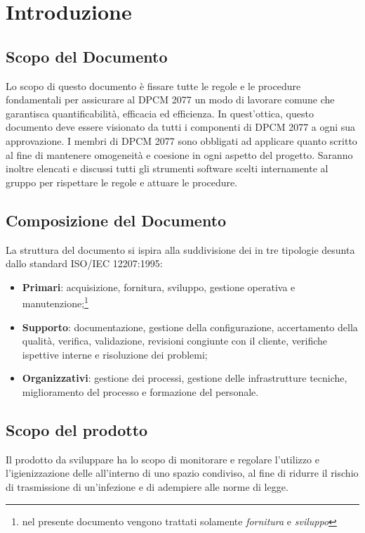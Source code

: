 \section{Introduzione}

\subsection{Scopo del Documento}
Lo scopo di questo documento è fissare tutte le  regole e le procedure fondamentali per assicurare al  DPCM 2077 un modo di lavorare comune che garantisca quantificabilità, efficacia ed efficienza.
In quest’ottica, questo documento deve essere visionato da tutti i componenti di DPCM 2077 a ogni sua approvazione. 
I membri di DPCM 2077 sono obbligati ad applicare quanto scritto al fine di mantenere omogeneità e coesione in ogni aspetto del progetto. Saranno inoltre elencati e discussi tutti gli   
strumenti software scelti internamente al gruppo per rispettare le regole e attuare le procedure.

\subsection{Composizione del Documento}
La struttura del documento si ispira alla suddivisione dei  in tre tipologie desunta dallo standard ISO/IEC 12207:1995:
\begin{itemize}
\item{\textbf{Primari}: acquisizione, fornitura, sviluppo, gestione operativa e manutenzione;\footnote{nel presente documento vengono trattati solamente \textit{fornitura} e \textit{sviluppo}}}
\item{\textbf{Supporto}: documentazione, gestione della configurazione, accertamento della qualità, verifica, validazione, revisioni congiunte con il cliente, verifiche ispettive interne e risoluzione dei problemi;}
\item{\textbf{Organizzativi}: gestione dei processi, gestione delle infrastrutture tecniche, miglioramento del processo e formazione del personale.}
\end{itemize}

\subsection{Scopo del prodotto}
Il prodotto da sviluppare ha lo scopo di monitorare e regolare l'utilizzo e l'igienizzazione delle  all'interno di uno spazio condiviso, al fine di ridurre il rischio di trasmissione di un'infezione e di adempiere alle norme di legge. 
